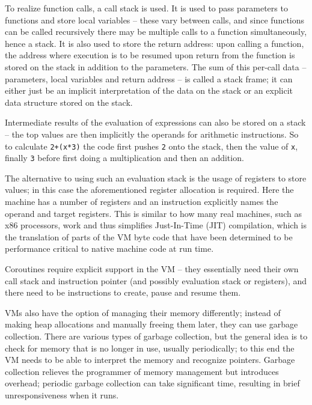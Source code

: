 		To realize function calls, a call stack is used. It is used to pass parameters to functions and store local variables -- these vary between calls, and since functions can be called recursively there may be multiple calls to a function simultaneously, hence a stack. It is also used to store the return address: upon calling a function, the address where execution is to be resumed upon return from the function is stored on the stack in addition to the parameters. The sum of this per-call data -- parameters, local variables and return address -- is called a stack frame; it can either just be an implicit interpretation of the data on the stack or an explicit data structure stored on the stack.
		
		Intermediate results of the evaluation of expressions can also be stored on a stack -- the top values are then implicitly the operands for arithmetic instructions. So to calculate \lstinline$2+(x*3)$ the code first pushes \lstinline$2$ onto the stack, then the value of \lstinline$x$, finally \lstinline$3$ before first doing a multiplication and then an addition.
		
		The alternative to using such an evaluation stack is the usage of registers to store values; in this case the aforementioned register allocation is required. Here the machine has a number of registers and an instruction explicitly names the operand and target registers. This is similar to how many real machines, such as x86 processors, work and thus simplifies Just-In-Time (JIT) compilation, which is the translation of parts of the VM byte code that have been determined to be performance critical to native machine code at run time.
		
		Coroutines require explicit support in the VM -- they essentially need their own call stack and instruction pointer (and possibly evaluation stack or registers), and there need to be instructions to create, pause and resume them.
		
		VMs also have the option of managing their memory differently; instead of making heap allocations and manually freeing them later, they can use garbage collection. There are various types of garbage collection, but the general idea is to check for memory that is no longer in use, usually periodically; to this end the VM needs to be able to interpret the memory and recognize pointers. Garbage collection relieves the programmer of memory management but introduces overhead; periodic garbage collection can take significant time, resulting in brief unresponsiveness when it runs.
		
